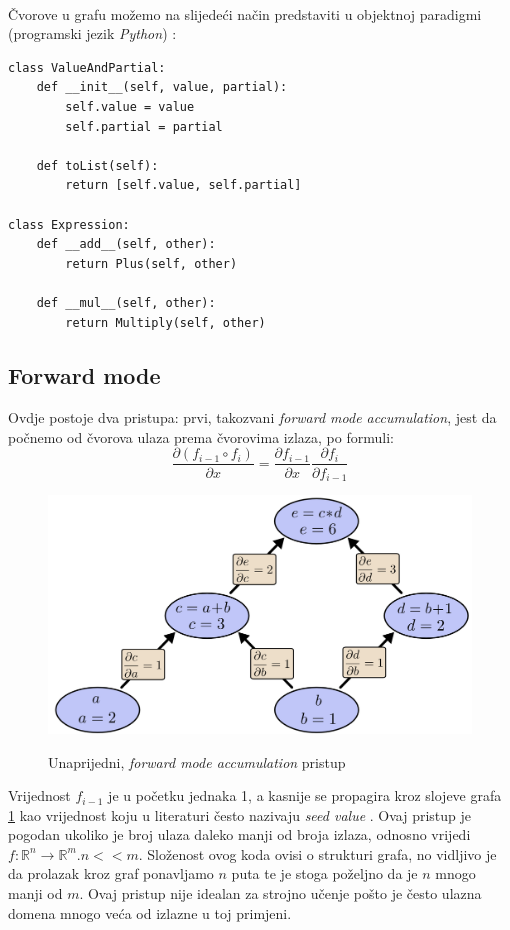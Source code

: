 \documentclass[zavrsnirad]{fer}
\begin{document}
\\
Čvorove u grafu možemo na slijedeći način predstaviti u objektnoj paradigmi (programski jezik \textit{Python}) \cite{wiki:autodiff}:
\lstset{language=python}
\begin{lstlisting}
class ValueAndPartial:
    def __init__(self, value, partial):
        self.value = value
        self.partial = partial

    def toList(self):
        return [self.value, self.partial]

class Expression:
    def __add__(self, other):
        return Plus(self, other)

    def __mul__(self, other):
        return Multiply(self, other)
\end{lstlisting}
\subsection{Forward mode}
Ovdje postoje dva pristupa: prvi, takozvani \textit{forward mode accumulation}, jest da počnemo od čvorova ulaza prema čvorovima izlaza, po formuli:
\begin{equation}
  \frac{\partial (f_{i-1} \circ f_i)}{\partial x} = \frac{\partial f_{i-1}}{\partial x} \frac{\partial f_i}{\partial f_{i-1}}
\end{equation}
\begin{figure}[h]
  \centering
  \includegraphics[width=0.7\linewidth]{"./slike/forward_graph.png"}
  \caption{Unaprijedni, \textit{forward mode accumulation} pristup}
  \cite{wuciawe_github}
  \label{slk:forward_graph}
\end{figure}
Vrijednost $f_{i-1}$ je u početku jednaka 1, a kasnije se propagira kroz slojeve grafa \ref{slk:forward_graph} kao vrijednost koju u literaturi često nazivaju \textit{seed value} \cite{prague:diffcpp}. Ovaj pristup je pogodan ukoliko je broj ulaza daleko manji od broja izlaza, odnosno vrijedi $f\colon \mathbb{R}^n \rightarrow \mathbb{R}^m. n << m$. Složenost ovog koda ovisi o strukturi grafa, no vidljivo je da prolazak kroz graf ponavljamo $n$ puta te je stoga poželjno da je $n$ mnogo manji od $m$. Ovaj pristup nije idealan za strojno učenje pošto je često ulazna domena mnogo veća od izlazne u toj primjeni.
\end{document}
